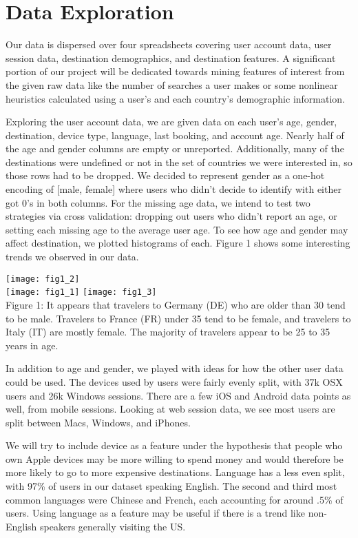 \documentclass[a4paper, 11pt]{article}
\begin{document}
\section*{Data Exploration}
\par
Our data is dispersed over four spreadsheets covering user account data, user session data, destination demographics, and destination features. A significant portion of our project will be dedicated towards mining features of interest from the given raw data like the number of searches a user makes or some nonlinear heuristics calculated using a user’s and each country’s demographic information. 
\par
Exploring the user account data, we are given data on each user’s age, gender, destination, device type, language, last booking, and account age. Nearly half of the age and gender columns are empty or unreported. Additionally, many of the destinations were undefined or not in the set of countries we were interested in, so those rows had to be dropped. We decided to represent gender as a one-hot encoding of [male, female] where users who didn’t decide to identify with either got 0’s in both columns. For the missing age data, we intend to test two strategies via cross validation: dropping out users who didn’t report an age, or setting each missing age to the average user age. To see how age and gender may affect destination, we plotted histograms of each. Figure 1 shows some interesting trends we observed in our data.
\begin{center}
\texttt{[image: fig1\_2]} \\
\texttt{[image: fig1\_1]}
\texttt{[image: fig1\_3]} \\
Figure 1: It appears that travelers to Germany (DE) who are older than 30 tend to be male. Travelers to France (FR) under 35 tend to be female, and travelers to Italy (IT) are mostly female. The majority of travelers appear to be 25 to 35 years in age.
\end{center}
\par
In addition to age and gender, we played with ideas for how the other user data could be used. The devices used by users were fairly evenly split, with 37k OSX users and 26k Windows sessions. There are a few iOS and Android data points as well, from mobile sessions. Looking at web session data, we see most users are split between Macs, Windows, and iPhones.
\par
We will try to include device as a feature under the hypothesis that people who own Apple devices may be more willing to spend money and would therefore be more likely to go to more expensive destinations. Language has a less even split, with 97\% of users in our dataset speaking English. The second and third most common languages were Chinese and French, each accounting for around .5\% of users. Using language as a feature may be useful if there is a trend like non-English speakers generally visiting the US.
\end{document}

